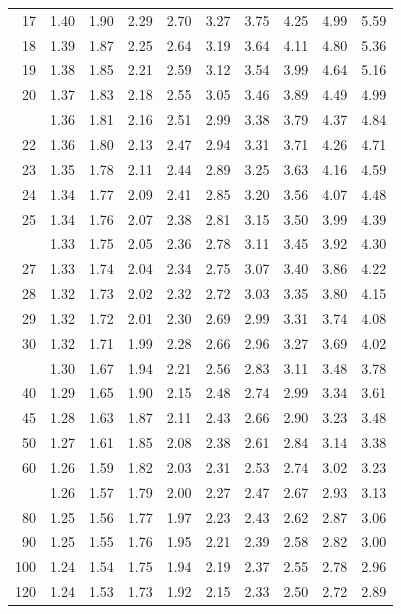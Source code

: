 \documentclass[10pt]{article}
\begin{document}
\begin{longtable}{@{}r!{\vrule width 0.8pt\hspace{0.55em}}rrrrrrrrr@{}}
17 & 1.40 & 1.90 & 2.29 & 2.70 & 3.27 & 3.75 & 4.25 & 4.99 & 5.59 \\
18 & 1.39 & 1.87 & 2.25 & 2.64 & 3.19 & 3.64 & 4.11 & 4.80 & 5.36 \\
19 & 1.38 & 1.85 & 2.21 & 2.59 & 3.12 & 3.54 & 3.99 & 4.64 & 5.16 \\
20 & 1.37 & 1.83 & 2.18 & 2.55 & 3.05 & 3.46 & 3.89 & 4.49 & 4.99 \\
 & 1.36 & 1.81 & 2.16 & 2.51 & 2.99 & 3.38 & 3.79 & 4.37 & 4.84 \\
22 & 1.36 & 1.80 & 2.13 & 2.47 & 2.94 & 3.31 & 3.71 & 4.26 & 4.71 \\
23 & 1.35 & 1.78 & 2.11 & 2.44 & 2.89 & 3.25 & 3.63 & 4.16 & 4.59 \\
24 & 1.34 & 1.77 & 2.09 & 2.41 & 2.85 & 3.20 & 3.56 & 4.07 & 4.48 \\
25 & 1.34 & 1.76 & 2.07 & 2.38 & 2.81 & 3.15 & 3.50 & 3.99 & 4.39 \\
 & 1.33 & 1.75 & 2.05 & 2.36 & 2.78 & 3.11 & 3.45 & 3.92 & 4.30 \\
27 & 1.33 & 1.74 & 2.04 & 2.34 & 2.75 & 3.07 & 3.40 & 3.86 & 4.22 \\
28 & 1.32 & 1.73 & 2.02 & 2.32 & 2.72 & 3.03 & 3.35 & 3.80 & 4.15 \\
29 & 1.32 & 1.72 & 2.01 & 2.30 & 2.69 & 2.99 & 3.31 & 3.74 & 4.08 \\
30 & 1.32 & 1.71 & 1.99 & 2.28 & 2.66 & 2.96 & 3.27 & 3.69 & 4.02 \\
 & 1.30 & 1.67 & 1.94 & 2.21 & 2.56 & 2.83 & 3.11 & 3.48 & 3.78 \\
40 & 1.29 & 1.65 & 1.90 & 2.15 & 2.48 & 2.74 & 2.99 & 3.34 & 3.61 \\
45 & 1.28 & 1.63 & 1.87 & 2.11 & 2.43 & 2.66 & 2.90 & 3.23 & 3.48 \\
50 & 1.27 & 1.61 & 1.85 & 2.08 & 2.38 & 2.61 & 2.84 & 3.14 & 3.38 \\
60 & 1.26 & 1.59 & 1.82 & 2.03 & 2.31 & 2.53 & 2.74 & 3.02 & 3.23 \\
 & 1.26 & 1.57 & 1.79 & 2.00 & 2.27 & 2.47 & 2.67 & 2.93 & 3.13 \\
80 & 1.25 & 1.56 & 1.77 & 1.97 & 2.23 & 2.43 & 2.62 & 2.87 & 3.06 \\
90 & 1.25 & 1.55 & 1.76 & 1.95 & 2.21 & 2.39 & 2.58 & 2.82 & 3.00 \\
100 & 1.24 & 1.54 & 1.75 & 1.94 & 2.19 & 2.37 & 2.55 & 2.78 & 2.96 \\
120 & 1.24 & 1.53 & 1.73 & 1.92 & 2.15 & 2.33 & 2.50 & 2.72 & 2.89 \\

\end{longtable}
\end{document}
